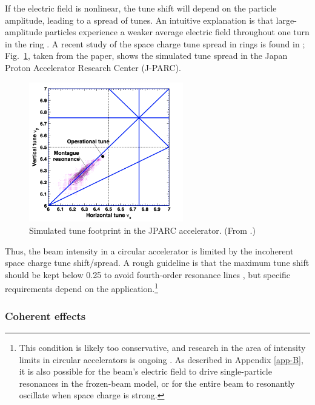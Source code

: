 If the electric field is nonlinear, the tune shift will depend on the particle amplitude, leading to a spread of tunes. An intuitive explanation is that large-amplitude particles experience a weaker average electric field throughout one turn in the ring \cite{Franchetti2017}. A recent study of the space charge tune spread in rings is found in \cite{Hotchi2020}; Fig.~\ref{fig:jparc_montague}, taken from the paper, shows the simulated tune spread in the Japan Proton Accelerator Research Center (J-PARC).
%
\begin{figure}[!p]
    \centering
    \includegraphics[width=0.6\textwidth]{Images/chapter1/montague.png}
    \caption{Simulated tune footprint in the JPARC accelerator. (From \cite{Hotchi2020}.)}
    \label{fig:jparc_montague}
\end{figure}
%

Thus, the beam intensity in a circular accelerator is limited by the incoherent space charge tune shift/spread. A rough guideline is that the maximum tune shift should be kept below 0.25 to avoid fourth-order resonance lines \cite{book:Reiser}, but specific requirements depend on the application.\footnote{This condition is likely too conservative, and research in the area of intensity limits in circular accelerators is ongoing \cite{Cousineau2003, Hofmann2017Book, Kojima2019, Kojima2022}. As described in Appendix \ref{app-B}, it is also possible for the beam's electric field to drive single-particle resonances in the frozen-beam model, or for the entire beam to resonantly oscillate when space charge is strong.}



\subsubsection{Coherent effects}


